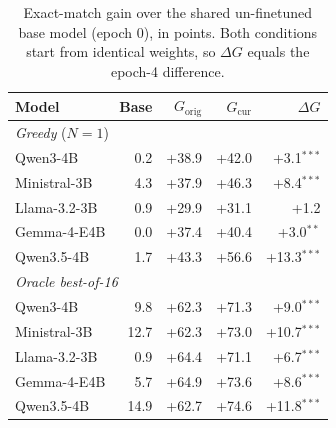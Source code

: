\begin{table}[t]
\centering
\small
\begin{tabular}{lrrrr}
\toprule
Model & Base & $G_{\text{orig}}$ & $G_{\text{cur}}$ & $\Delta G$ \\
\midrule
\multicolumn{5}{l}{\textit{Greedy} ($N=1$)} \\
Qwen3-4B & 0.2 & +38.9 & +42.0 & +3.1$^{***}$ \\
Ministral-3B & 4.3 & +37.9 & +46.3 & +8.4$^{***}$ \\
Llama-3.2-3B & 0.9 & +29.9 & +31.1 & +1.2 \\
Gemma-4-E4B & 0.0 & +37.4 & +40.4 & +3.0$^{**}$ \\
Qwen3.5-4B & 1.7 & +43.3 & +56.6 & +13.3$^{***}$ \\
\midrule
\multicolumn{5}{l}{\textit{Oracle best-of-16}} \\
Qwen3-4B & 9.8 & +62.3 & +71.3 & +9.0$^{***}$ \\
Ministral-3B & 12.7 & +62.3 & +73.0 & +10.7$^{***}$ \\
Llama-3.2-3B & 0.9 & +64.4 & +71.1 & +6.7$^{***}$ \\
Gemma-4-E4B & 5.7 & +64.9 & +73.6 & +8.6$^{***}$ \\
Qwen3.5-4B & 14.9 & +62.7 & +74.6 & +11.8$^{***}$ \\
\bottomrule
\end{tabular}
\caption{Exact-match gain over the shared un-finetuned base model (epoch 0), in points. Both conditions start from identical weights, so $\Delta G$ equals the epoch-4 difference.}
\label{tab:gain}
\end{table}
